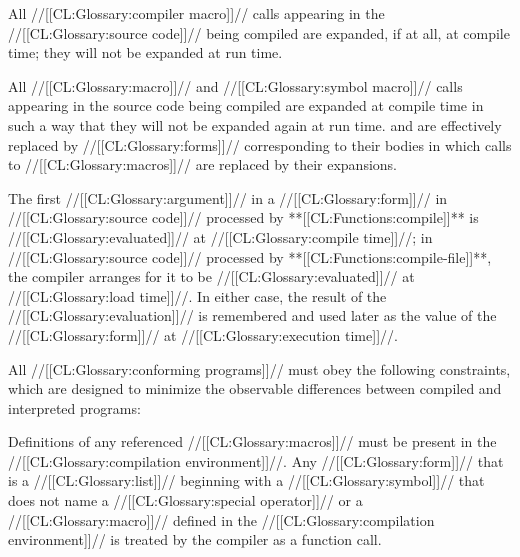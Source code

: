 \beginlist  {}

\itemitem{\bull} All //[[CL:Glossary:compiler macro]]// calls appearing in the //[[CL:Glossary:source code]]// being compiled are expanded, if at all, at compile time; they will not be expanded at run time.

 \itemitem{\bull} All //[[CL:Glossary:macro]]// and  //[[CL:Glossary:symbol macro]]// calls appearing in the source code being compiled are expanded at compile time in such a way that they will not be expanded again at run time.  and  are effectively replaced by //[[CL:Glossary:forms]]// corresponding to their bodies in which calls to  //[[CL:Glossary:macros]]// are replaced by their expansions.
 

\itemitem{\bull}  The first //[[CL:Glossary:argument]]// in a  //[[CL:Glossary:form]]//  in //[[CL:Glossary:source code]]// processed by **[[CL:Functions:compile]]** is //[[CL:Glossary:evaluated]]// at //[[CL:Glossary:compile time]]//; in //[[CL:Glossary:source code]]// processed by **[[CL:Functions:compile-file]]**,  the compiler arranges for it to be //[[CL:Glossary:evaluated]]// at //[[CL:Glossary:load time]]//. In either case, the result of the //[[CL:Glossary:evaluation]]// is remembered and used later as the value of the   //[[CL:Glossary:form]]// at //[[CL:Glossary:execution time]]//.

\endlist
  \endsubsubsection%

 

All //[[CL:Glossary:conforming programs]]// must obey the following constraints, which are designed to minimize the observable differences  between compiled and interpreted programs:

\beginlist

 \itemitem{\bull} Definitions of any referenced //[[CL:Glossary:macros]]// must be present in the //[[CL:Glossary:compilation environment]]//.   Any //[[CL:Glossary:form]]// that is a //[[CL:Glossary:list]]// beginning with a //[[CL:Glossary:symbol]]// that does not name a //[[CL:Glossary:special operator]]// or a //[[CL:Glossary:macro]]// defined in the  //[[CL:Glossary:compilation environment]]// is treated by the compiler as a  function call.

